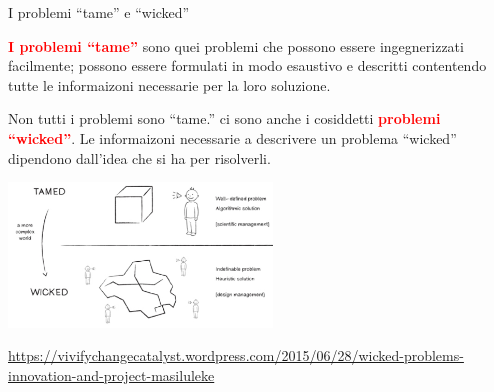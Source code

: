 \documentclass{beamer}
\begin{document}

\begin{frame}{\centerline{I problemi ``tame'' e ``wicked''}}

\begin{small}
\textcolor{red}{\bf I problemi ``tame''} sono quei problemi che possono essere ingegnerizzati facilmente; possono essere formulati in modo esaustivo e descritti contentendo tutte le informaizoni necessarie per la loro soluzione.

Non tutti i problemi sono ``tame.'' ci sono anche i cosiddetti 
\textcolor{red}{\bf problemi ``wicked''}. Le informaizoni necessarie a descrivere un problema ``wicked'' dipendono dall'idea che si ha per risolverli.

\begin{center}
\includegraphics[width=70mm]{P2023.AIBCCSS.IlConcettoDiSoftware/pic-03.png}
\end{center}

\end{small}

\begin{center}
\tiny
\url{https://vivifychangecatalyst.wordpress.com/2015/06/28/wicked-problems-innovation-and-project-masiluleke}

\end{center}


\end{frame}

\end{document}
